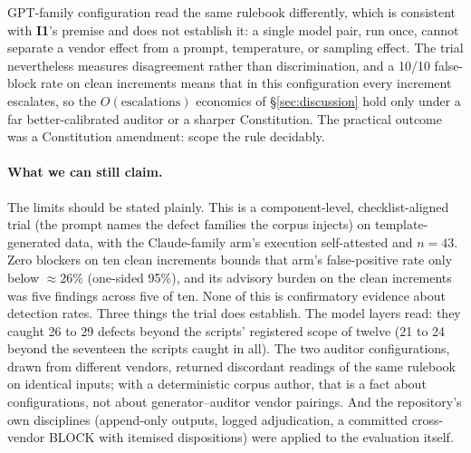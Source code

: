 \documentclass[11pt]{article}
\newcommand{\invariant}[1]{\textbf{I#1}}
\begin{document}
GPT-family configuration read the same rulebook differently, which is consistent with \invariant{1}'s premise and does not establish it: a single model pair, run once, cannot separate a vendor effect from a prompt, temperature, or sampling effect. The trial nevertheless measures disagreement rather than discrimination, and a 10/10 false-block rate on clean increments means that in this configuration every increment escalates, so the $O(\text{escalations})$ economics of \S\ref{sec:discussion} hold only under a far better-calibrated auditor or a sharper Constitution. The practical outcome was a Constitution amendment: scope the rule decidably.

\paragraph{What we can still claim.} The limits should be stated plainly. This is a component-level, checklist-aligned trial (the prompt names the defect families the corpus injects) on template-generated data, with the Claude-family arm's execution self-attested and $n{=}43$. Zero blockers on ten clean increments bounds that arm's false-positive rate only below ${\approx}26\%$ (one-sided 95\%), and its advisory burden on the clean increments was five findings across five of ten. None of this is confirmatory evidence about detection rates. Three things the trial does establish. The model layers read: they caught 26 to 29 defects beyond the scripts' registered scope of twelve (21 to 24 beyond the seventeen the scripts caught in all). The two auditor configurations, drawn from different vendors, returned discordant readings of the same rulebook on identical inputs; with a deterministic corpus author, that is a fact about configurations, not about generator--auditor vendor pairings. And the repository's own disciplines (append-only outputs, logged adjudication, a committed cross-vendor BLOCK with itemised dispositions) were applied to the evaluation itself.
\end{document}
